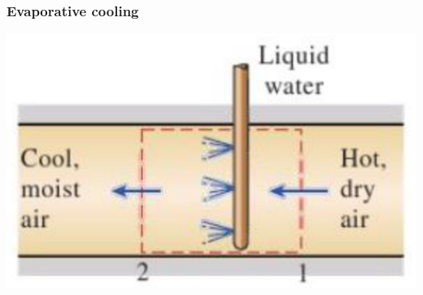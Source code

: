 \documentclass[11pt]{article}
\begin{document}
\subsubsection{Evaporative cooling}
\label{sec:org58f5641}
\begin{center}
\includegraphics[scale=0.7]{./images/evaporative-cooling-diagram.png}
\end{center}
\end{document}
